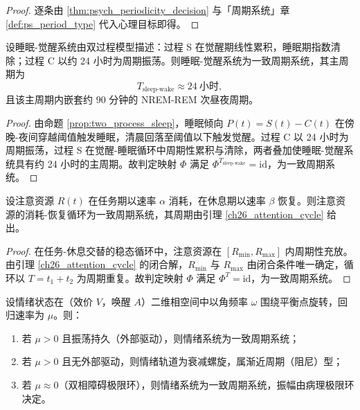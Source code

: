 \begin{proof}
逐条由 \cref{thm:psych_periodicity_decision} 与「周期系统」章 \cref{def:ps_period_type} 代入心理目标即得。
\end{proof}

\begin{lemma}[睡眠-觉醒周期的判定]\label{lem:sleep_periodic}
设睡眠-觉醒系统由双过程模型描述：过程 S 在觉醒期线性累积，睡眠期指数清除；过程 C 以约 24 小时为周期振荡。则睡眠-觉醒系统为一致周期系统，其主周期为
\[
T_{\text{sleep-wake}}\approx 24\ \text{小时},
\]
且该主周期内嵌套约 $90$ 分钟的 NREM-REM 次昼夜周期。
\end{lemma}

\begin{proof}
由命题 \ref{prop:two_process_sleep}，睡眠倾向 $P(t)=S(t)-C(t)$ 在傍晚-夜间穿越阈值触发睡眠，清晨回落至阈值以下触发觉醒。过程 C 以 24 小时为周期振荡，过程 S 在觉醒-睡眠循环中周期性累积与清除，两者叠加使睡眠-觉醒系统具有约 24 小时的主周期。故判定映射 $\Phi$ 满足 $\Phi^{T_{\text{sleep-wake}}}=\mathrm{id}$，为一致周期系统。
\end{proof}

\begin{lemma}[注意波动的周期判定]\label{lem:attention_periodic}
设注意资源 $R(t)$ 在任务期以速率 $\alpha$ 消耗，在休息期以速率 $\beta$ 恢复。则注意资源的消耗-恢复循环为一致周期系统，其周期由引理 \ref{ch26_attention_cycle} 给出。
\end{lemma}

\begin{proof}
在任务-休息交替的稳态循环中，注意资源在 $[R_{\min},R_{\max}]$ 内周期性充放。由引理 \ref{ch26_attention_cycle} 的闭合解，$R_{\min}$ 与 $R_{\max}$ 由闭合条件唯一确定，循环以 $T=t_1+t_2$ 为周期重复。故判定映射 $\Phi$ 满足 $\Phi^T=\mathrm{id}$，为一致周期系统。
\end{proof}

\begin{lemma}[情绪周期的判定]\label{lem:emotion_periodic}
设情绪状态在（效价 $V$，唤醒 $A$）二维相空间中以角频率 $\omega$ 围绕平衡点旋转，回归速率为 $\mu$。则：
\begin{enumerate}[label=(\roman*)]
    \item 若 $\mu>0$ 且振荡持久（外部驱动），则情绪系统为一致周期系统；
    \item 若 $\mu>0$ 且无外部驱动，则情绪轨道为衰减螺旋，属渐近周期（阻尼）型；
    \item 若 $\mu\approx 0$（双相障碍极限环），则情绪系统为一致周期系统，振幅由病理极限环决定。
\end{enumerate}
\end{lemma}

